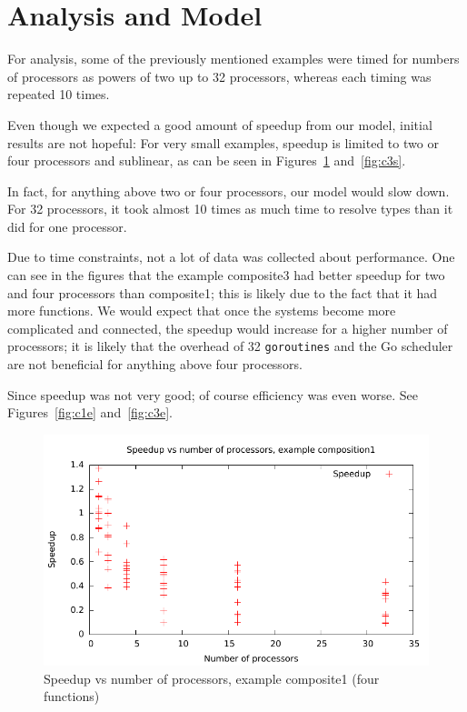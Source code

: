 \documentclass{acm_proc_article-sp}
\begin{document}
\section{Analysis and Model}

For analysis, some of the previously mentioned examples were timed for numbers
of processors as powers of two up to 32 processors, whereas each timing was
repeated 10 times.

Even though we expected a good amount of speedup from our model, initial
results are not hopeful: For very small examples, speedup is limited to two or
four processors and sublinear, as can be seen in Figures~\ref{fig:c1s}
and~\ref{fig:c3s}. 

In fact, for anything above two or four processors, our model would slow down.
For 32 processors, it took almost 10 times as much time to resolve types than
it did for one processor.

Due to time constraints, not a lot of data was collected about performance. One
can see in the figures that the example composite3 had better speedup for two
and four processors than composite1; this is likely due to the fact that it had
more functions. We would expect that once the systems become more complicated
and connected, the speedup would increase for a higher number of processors; it
is likely that the overhead of 32 \texttt{goroutines} and the Go scheduler are
not beneficial for anything above four processors.

Since speedup was not very good; of course efficiency was even worse. See
Figures~\ref{fig:c1e} and~\ref{fig:c3e}.

\begin{figure}[ht] 
	\centering
	\includegraphics[scale=0.6]{../../data/composite1-speedup.pdf}
	\caption{Speedup vs number of processors, example composite1 (four
	functions)} 
	\label{fig:c1s} 
\end{figure} 
\end{document}
